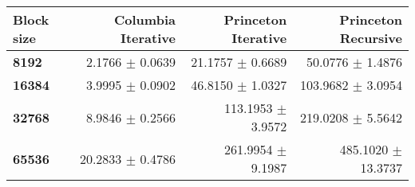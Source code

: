 \begin{tabular}{lrrr}\toprule
\textbf{Block size}  & \textbf{Columbia Iterative} & \textbf{Princeton Iterative} & \textbf{Princeton Recursive}\\\midrule
\textbf{8192}  & 2.1766 $\pm$ 0.0639 & 21.1757 $\pm$ 0.6689 & 50.0776 $\pm$ 1.4876\\
\textbf{16384}  & 3.9995 $\pm$ 0.0902 & 46.8150 $\pm$ 1.0327 & 103.9682 $\pm$ 3.0954\\
\textbf{32768}  & 8.9846 $\pm$ 0.2566 & 113.1953 $\pm$ 3.9572 & 219.0208 $\pm$ 5.5642\\
\textbf{65536} & 20.2833 $\pm$ 0.4786 & 261.9954 $\pm$ 9.1987 & 485.1020 $\pm$ 13.3737\\
\bottomrule
\end{tabular}
